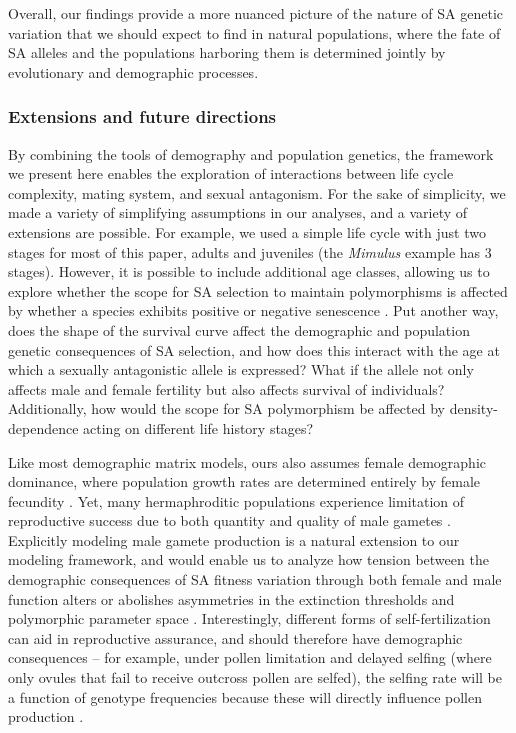\documentclass[11pt]{article}
\begin{document}
Overall, our findings provide a more nuanced picture of the nature of SA genetic variation that we should expect to find in natural populations, where the fate of SA alleles and the populations harboring them is determined jointly by evolutionary and demographic processes.


\subsubsection*{Extensions and future directions}

By combining the tools of demography and population genetics, the framework we present here enables the exploration of interactions between life cycle complexity, mating system, and sexual antagonism. For the sake of simplicity, we made a variety of simplifying assumptions in our analyses, and a variety of extensions are possible. For example, we used a simple life cycle with just two stages for most of this paper, adults and juveniles (the \textit{Mimulus} example has $3$ stages). However, it is possible to include additional age classes, allowing us to explore whether the scope for SA selection to maintain polymorphisms is affected by whether a species exhibits positive or negative senescence \citep{jones2014diversity}. Put another way, does the shape of the survival curve affect the demographic and population genetic consequences of SA selection, and how does this interact with the age at which a sexually antagonistic allele is expressed? What if the allele not only affects male and female fertility but also affects survival of individuals? Additionally, how would the scope for SA polymorphism be affected by density-dependence acting on different life history stages?

Like most demographic matrix models, ours also assumes female demographic dominance, where population growth rates are determined entirely by female fecundity \citep{pollard1975mathematical,Caswell2001,iannelli2005gender}. Yet, many hermaphroditic populations experience limitation of reproductive success due to both quantity and quality of male gametes \citep[e.g.,][]{Yund2000,AizenHarder2007, Harder2016}. Explicitly modeling male gamete production is a natural extension to our modeling framework, and would enable us to analyze how tension between the demographic consequences of SA fitness variation through both female and male function alters or abolishes asymmetries in the extinction thresholds and polymorphic parameter space \citep[e.g.,][]{Tazzyman2015}.  Interestingly, different forms of self-fertilization can aid in reproductive assurance, and should therefore have demographic consequences -- for example, under pollen limitation and delayed selfing (where only ovules that fail to receive outcross pollen are selfed), the selfing rate will be a function of genotype frequencies because these will directly influence pollen production \citep{HarderBarrett2006}.
\end{document}
